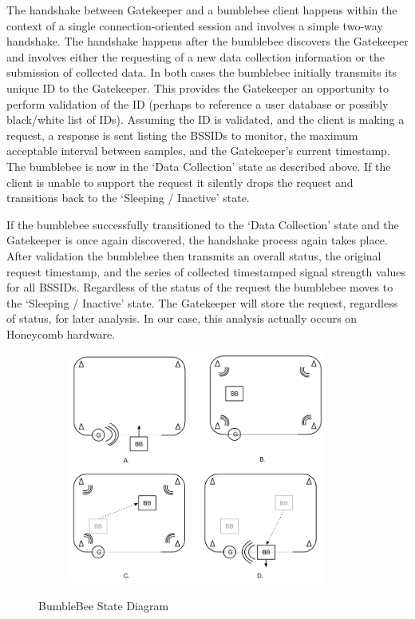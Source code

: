 The handshake between Gatekeeper and a bumblebee client happens within the context of a single connection-oriented session and involves a simple two-way handshake. The handshake happens after the bumblebee discovers the Gatekeeper and involves either the requesting of a new data collection information or the submission of collected data. In both cases the bumblebee initially transmits its unique ID to the Gatekeeper. This provides the Gatekeeper an opportunity to perform validation of the ID (perhaps to reference a user database or possibly black/white list of IDs). Assuming the ID is validated, and the client is making a request, a response is sent listing the BSSIDs to monitor, the maximum acceptable interval between samples, and the Gatekeeper’s current timestamp. The bumblebee is now in the ‘Data Collection’ state as described above. If the client is unable to support the request it silently drops the request and transitions back to the ‘Sleeping / Inactive’ state.

If the bumblebee successfully transitioned to the ‘Data Collection’ state and the Gatekeeper is once again discovered, the handshake process again takes place. After validation the bumblebee then transmits an overall status, the original request timestamp, and the series of collected timestamped signal strength values for all BSSIDs. Regardless of the status of the request the bumblebee moves to the ‘Sleeping / Inactive’ state. The Gatekeeper will store the request, regardless of status, for later analysis. In our case, this analysis actually occurs on Honeycomb hardware.


\begin{figure}[htb] %
	\begin{center}
		\ \includegraphics[width=4in,height=3in]{BumbleBeeExample.png}
		\caption{BumbleBee State Diagram}
		\label{bumblebestatediagram}
	\end{center}
\end{figure}

